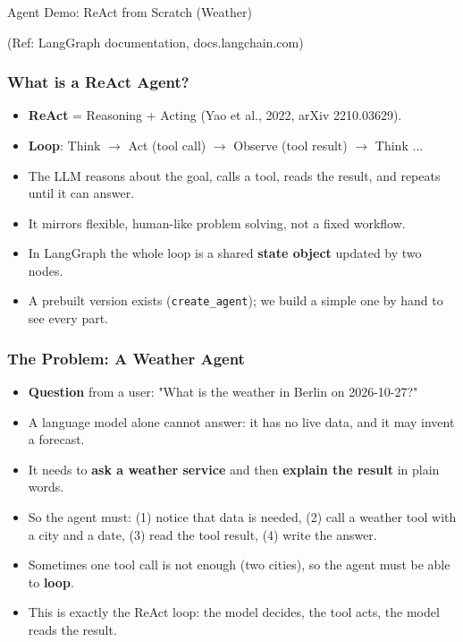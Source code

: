 \begin{frame}[fragile]\frametitle{}
\begin{center}
{\Large Agent Demo: ReAct from Scratch (Weather)}

{\tiny (Ref: LangGraph documentation, docs.langchain.com)}
\end{center}
\end{frame}

\begin{frame}[fragile]\frametitle{What is a ReAct Agent?}
      \begin{itemize}
        \item \textbf{ReAct} = Reasoning + Acting (Yao et al., 2022, arXiv 2210.03629).
        \item \textbf{Loop}: Think \(\rightarrow\) Act (tool call) \(\rightarrow\) Observe (tool result) \(\rightarrow\) Think \(\dots\)
        \item The LLM reasons about the goal, calls a tool, reads the result, and repeats until it can answer.
        \item It mirrors flexible, human-like problem solving, not a fixed workflow.
        \item In LangGraph the whole loop is a shared \textbf{state object} updated by two nodes.
        \item A prebuilt version exists (\texttt{create\_agent}); we build a simple one by hand to see every part.
      \end{itemize}
\end{frame}

\begin{frame}[fragile]\frametitle{The Problem: A Weather Agent}
      \begin{itemize}
        \item \textbf{Question} from a user: "What is the weather in Berlin on 2026-10-27?"
        \item A language model alone cannot answer: it has no live data, and it may invent a forecast.
        \item It needs to \textbf{ask a weather service} and then \textbf{explain the result} in plain words.
        \item So the agent must: (1) notice that data is needed, (2) call a weather tool with a city and a date, (3) read the tool result, (4) write the answer.
        \item Sometimes one tool call is not enough (two cities), so the agent must be able to \textbf{loop}.
        \item This is exactly the ReAct loop: the model decides, the tool acts, the model reads the result.
      \end{itemize}
\end{frame}

